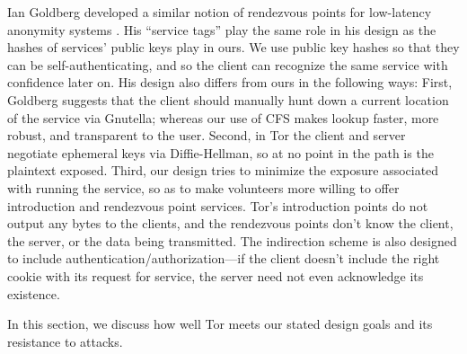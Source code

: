 \documentclass[times,10pt,twocolumn]{article}
\begin{document}
Ian Goldberg developed a similar notion of rendezvous points for
low-latency anonymity systems \cite{ian-thesis}. His ``service tags''
play the same role in his design as the hashes of services' public
keys play in ours.  We use public key hashes so that they can be
self-authenticating, and so the client can recognize the same service
with confidence later on. His design also differs from ours in the
following ways: First, Goldberg suggests that the client should
manually hunt down a current location of the service via Gnutella;
whereas our use of CFS makes lookup faster, more robust, and
transparent to the user. Second, in Tor the client and server
negotiate ephemeral keys via Diffie-Hellman, so at no point in the
path is the plaintext exposed. Third, our design tries to minimize the
exposure associated with running the service, so as to make volunteers
more willing to offer introduction and rendezvous point services.
Tor's introduction points do not output any bytes to the clients, and
the rendezvous points don't know the client, the server, or the data
being transmitted. The indirection scheme is also designed to include
authentication/authorization---if the client doesn't include the right
cookie with its request for service, the server need not even
acknowledge its existence.

\label{sec:analysis}

In this section, we discuss how well Tor meets our stated design goals
and its resistance to attacks.
\end{document}
